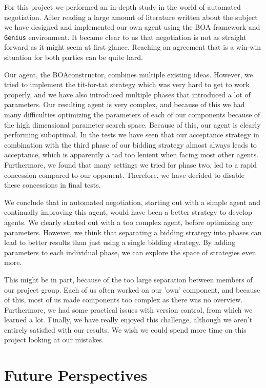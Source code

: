 

For this project we performed an in-depth study in the world of automated negotiation. After reading a large amount of literature written about the subject we have designed and implemented our own agent using the BOA framework and \texttt{Genius} environment. It became clear to us that negotiation is not as straight forward as it might seem at first glance. Reaching an agreement that is a win-win situation for both parties can be quite hard.

Our agent, the BOAconstructor, combines multiple existing ideas.
However, we tried to implement the tit-for-tat strategy which was very hard to get to work properly, and we have also introduced multiple phases that introduced a lot of parameters. Our resulting agent is very complex, and because of this we had many difficulties optimizing the parameters of each of our components because of the high dimensional parameter search space. Because of this, our agent is clearly performing suboptimal. In the tests we have seen that our acceptance strategy in combination with the third phase of our bidding strategy almost always leads to acceptance, which is apparently a tad too lenient when facing most other agents. Furthermore, we found that many settings we tried for phase two, led to a rapid concession compared to our opponent.  Therefore, we have decided to disable these concessions in final tests.

We conclude that in automated negotiation, starting out with a simple agent and 
continually improving this agent, would have been a better strategy to develop agents. 
We clearly started out with a too complex agent, before optimizing any parameters.
However, we think that separating a bidding strategy into phases can lead to 
better results than just using a single bidding strategy. By adding parameters
to each individual phase, we can explore the space of strategies even more.

This might be in part, because of the too large separation between members of our project group.
Each of us often worked on our 'own' component, and because of this, most of us made components too complex as there was no overview. Furthermore, we had some practical issues with version control, from which we learned a lot.
Finally, we have really enjoyed this challenge, although we aren't entirely satisfied with 
our results. We wish we could spend more time on this project looking at our mistakes.
 
\section{Future Perspectives}
